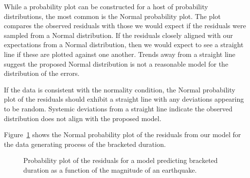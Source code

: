 \documentclass[
  letterpaper,
  DIV=11,
  numbers=noendperiod]{scrreprt}
\theoremstyle{definition}
\theoremstyle{definition}
\theoremstyle{plain}
\theoremstyle{remark}
\begin{document}
While a probability plot can be constructed for a host of probability
distributions, the most common is the Normal probability plot. The plot
compares the observed residuals with those we would expect if the
residuals were sampled from a Normal distribution. If the residuals
closely aligned with our expectations from a Normal distribution, then
we would expect to see a straight line if these are plotted against one
another. Trends away from a straight line suggest the proposed Normal
distribution is not a reasonable model for the distribution of the
errors.

\begin{tcolorbox}[enhanced jigsaw, colbacktitle=quarto-callout-note-color!10!white, colback=white, left=2mm, title=\textcolor{quarto-callout-note-color}{\faInfo}\hspace{0.5em}{Graphically Assessing the Normality Condition}, toptitle=1mm, leftrule=.75mm, breakable, bottomrule=.15mm, arc=.35mm, rightrule=.15mm, toprule=.15mm, coltitle=black, opacityback=0, colframe=quarto-callout-note-color-frame, opacitybacktitle=0.6, bottomtitle=1mm, titlerule=0mm]

If the data is consistent with the normality condition, the Normal
probability plot of the residuals should exhibit a straight line with
any deviations appearing to be random. Systemic deviations from a
straight line indicate the observed distribution does not align with the
proposed model.

\end{tcolorbox}

Figure~\ref{fig-regassessment-normal} shows the Normal probability plot
of the residuals from our model for the data generating process of the
bracketed duration.

\begin{figure}


\caption{\label{fig-regassessment-normal}Probability plot of the
residuals for a model predicting bracketed duration as a function of the
magnitude of an earthquake.}

\end{figure}%
\end{document}
